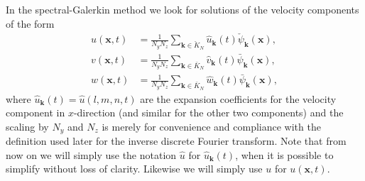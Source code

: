 \documentclass[preprint]{elsarticle}
\newcommand{\N}[1]{\check{#1}}
\newcommand{\D}[1]{\bar{#1}}
\begin{document}
In the spectral-Galerkin method we look for solutions of the velocity 
components of the form
\begin{align}
u(\bm{x}, t) &= \frac{1}{N_yN_z}\sum_{\bm{k} \in \N{K}_N} \hat{u}_{\bm{k}}(t) 
\N{\psi}_{\bm{k}}(\bm{x}), \label{eq:u_solx} \\
v(\bm{x}, t) &= \frac{1}{N_yN_z}\sum_{\bm{k} \in \D{K}_N} \hat{v}_{\bm{k}}(t) 
\D{\psi}_{\bm{k}}(\bm{x}), \label{eq:u_soly} \\
w(\bm{x}, t) &= \frac{1}{N_yN_z}\sum_{\bm{k} \in \D{K}_N} \hat{w}_{\bm{k}}(t) 
\D{\psi}_{\bm{k}}(\bm{x}), \label{eq:u_solz}
\end{align}
where $\hat{u}_{\bm{k}}(t) = \hat{u}(l, {m}, {n}, t)$ are the expansion 
coefficients for the velocity component in $x$-direction (and similar for the 
other two components) and the scaling by $N_y$ and $N_z$ is merely for 
convenience 
and compliance with the definition used later for the inverse discrete Fourier 
transform. Note that from now on we will simply use the notation $\hat{u}$ for 
$\hat{u}_{\bm{k}}(t)$, when it is possible to simplify without loss of clarity. 
Likewise we will simply use $u$ for $u(\bm{x}, t)$. 
\end{document}
